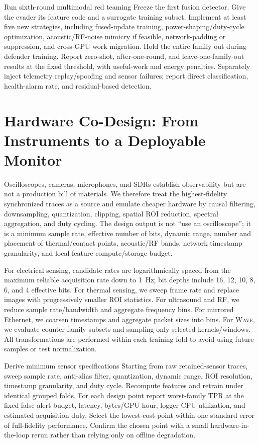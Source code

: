 \documentclass[sigplan,anonymous,review,nonacm]{acmart}
\newcommand{\wave}{\textsc{Wave}}
\begin{document}
\begin{experimentbox}{Run sixth-round multimodal red teaming}
Freeze the first fusion detector. Give the evader its feature code and a surrogate training subset. Implement at least five new strategies, including fused-update training, power-shaping/duty-cycle optimization, acoustic/RF-noise mimicry if feasible, network-padding or suppression, and cross-GPU work migration. Hold the entire family out during defender training. Report zero-shot, after-one-round, and leave-one-family-out results at the fixed threshold, with useful-work and energy penalties. Separately inject telemetry replay/spoofing and sensor failures; report direct classification, health-alarm rate, and residual-based detection.
\end{experimentbox}

\section{Hardware Co-Design: From Instruments to a Deployable Monitor}
\label{sec:codesign}

Oscilloscopes, cameras, microphones, and SDRs establish observability but are not a production bill of materials. We therefore treat the highest-fidelity synchronized traces as a source and emulate cheaper hardware by causal filtering, downsampling, quantization, clipping, spatial ROI reduction, spectral aggregation, and duty cycling. The design output is not ``use an oscilloscope''; it is a minimum sample rate, effective number of bits, dynamic range, number and placement of thermal/contact points, acoustic/RF bands, network timestamp granularity, and local feature-compute/storage budget.

For electrical sensing, candidate rates are logarithmically spaced from the maximum reliable acquisition rate down to 1~Hz; bit depths include 16, 12, 10, 8, 6, and 4 effective bits. For thermal sensing, we sweep frame rate and replace images with progressively smaller ROI statistics. For ultrasound and RF, we reduce sample rate/bandwidth and aggregate frequency bins. For mirrored Ethernet, we coarsen timestamps and aggregate packet sizes into bins. For \wave{}, we evaluate counter-family subsets and sampling only selected kernels/windows. All transformations are performed within each training fold to avoid using future samples or test normalization.

\begin{experimentbox}{Derive minimum sensor specifications}
Starting from raw retained-sensor traces, sweep sample rate, anti-alias filter, quantization, dynamic range, ROI resolution, timestamp granularity, and duty cycle. Recompute features and retrain under identical grouped folds. For each design point report worst-family TPR at the fixed false-alert budget, latency, bytes/GPU-hour, logger CPU utilization, and estimated acquisition duty. Select the lowest-cost point within one standard error of full-fidelity performance. Confirm the chosen point with a small hardware-in-the-loop rerun rather than relying only on offline degradation.
\end{experimentbox}
\end{document}
